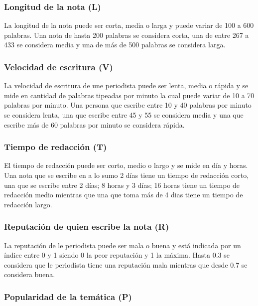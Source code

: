 \documentclass{article}
\begin{document}
\iffalse
\subsubsection*{Longitud de la nota (L)}

La longitud de la nota puede ser corta, media o larga y puede variar de 100 a 600 palabras. Una nota de hasta 200 palabras se considera corta, una de entre 267 a 433 se considera media y una de más de 500 palabras se considera larga.

\subsubsection*{Velocidad de escritura (V)}

La velocidad de escritura de une periodista puede ser lenta, media o rápida y se mide en cantidad de palabras tipeadas por minuto la cual puede variar de 10 a 70 palabras por minuto. Una persona que escribe entre 10 y 40 palabras por minuto se considera lenta, una que escribe entre 45 y 55 se considera media y una que escribe más de 60 palabras por minuto se considera rápida.

\subsubsection*{Tiempo de redacción (T)}

El tiempo de redacción puede ser corto, medio o largo y se mide en día y horas. Una nota que se escribe en a lo sumo 2 días tiene un tiempo de redacción corto, una que se escribe entre 2 días; 8 horas y 3 días; 16 horas tiene un tiempo de redacción medio mientras que una que toma más de 4 dias tiene un tiempo de redacción largo.

\subsubsection*{Reputación de quien escribe la nota (R)}

La reputación de le periodista puede ser mala o buena y está indicada por un índice entre 0 y 1 siendo 0 la peor reputación y 1 la máxima. Hasta 0.3 se considera que le periodista tiene una reputación mala mientras que desde 0.7 se considera buena.

\subsubsection*{Popularidad de la temática (P)}
\end{document}
